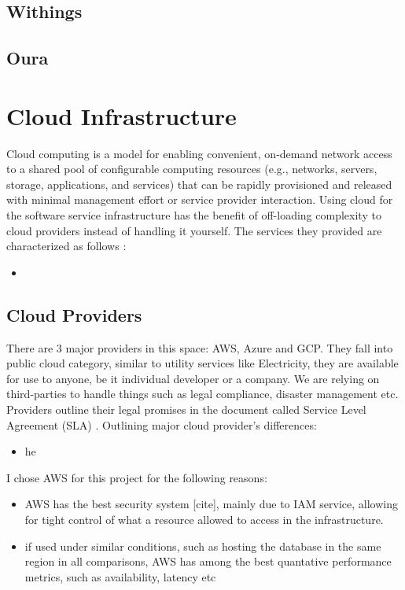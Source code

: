 \subsection{Withings}
\subsection{Oura}
\section{Cloud Infrastructure}
Cloud computing is a model for enabling convenient, on-demand network access to a shared pool of configurable computing
resources (e.g., networks, servers, storage, applications, and services) that can be rapidly provisioned and released with minimal
management effort or service provider interaction. \cite {cloudDef}
Using cloud for the software service infrastructure has the benefit of off-loading complexity to cloud providers instead of handling it yourself. The services they provided are characterized as follows \cite{cloudServicesCategories}: 
\begin{itemize}
    \item 
\end{itemize}

\subsection{Cloud Providers}
There are 3 major providers in this space: AWS, Azure and GCP. They fall into public cloud category, similar to utility services like Electricity, they are available for use to anyone, be it individual developer or a company. We are relying on third-parties to handle things such as legal compliance, disaster management etc. Providers outline their legal promises in the document called Service Level Agreement (SLA) \cite{cloudSLA}. Outlining major cloud provider's differences:
\begin{itemize}
    \item {he}
\end{itemize}

I chose AWS for this project for the following reasons:
\begin{itemize}
    \item{AWS has the best security system [cite], mainly due to IAM service, allowing for tight control of what a resource allowed to access in the infrastructure. }
    \item{if used under similar conditions, such as hosting the database in the same region in all comparisons, AWS has among the best quantative performance metrics, such as availability, latency etc \cite{CloudMetrics}  }
\end{itemize}

